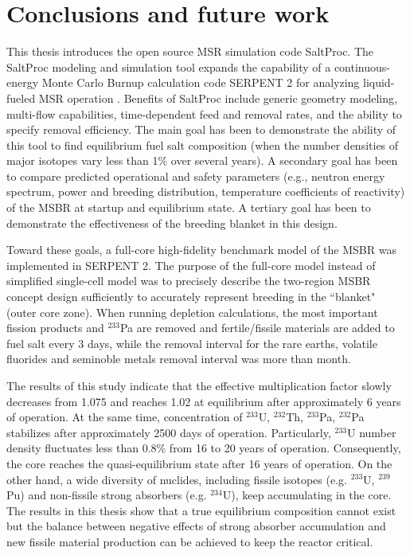 \chapter[Conclusions and future work]{Conclusions and future work}
This thesis introduces the open source \gls{MSR} simulation code SaltProc. The SaltProc modeling and simulation tool expands the capability of a continuous-energy Monte Carlo Burnup calculation code SERPENT 2 for analyzing liquid-fueled \gls{MSR} operation \cite{andrei_rykhlevskii_arfc/saltproc:_2018}. Benefits of SaltProc include generic geometry modeling, multi-flow capabilities, time-dependent feed and removal rates, and the ability to specify removal efficiency. The main goal has been to demonstrate the ability of this tool to find equilibrium fuel salt composition (when the number densities of major isotopes vary less than 1\% over several years). A secondary goal has been to compare predicted operational and safety parameters (e.g., neutron energy spectrum, power and breeding distribution, temperature coefficients of reactivity) of the \gls{MSBR} at startup and equilibrium state. A tertiary goal has been to demonstrate the effectiveness of the breeding blanket in this design.

Toward these goals, a full-core high-fidelity benchmark model of the \gls{MSBR} was implemented in SERPENT 2. The purpose of the full-core model instead of simplified single-cell model \cite{rykhlevskii_online_2017, betzler_molten_2017} was to precisely describe the two-region \gls{MSBR} concept design sufficiently to accurately represent breeding in the ``blanket" (outer core zone). When running depletion calculations, the most important fission products and $^{233}$Pa are removed and fertile/fissile materials are added to fuel salt every 3 days, while the removal interval for the rare earths, volatile fluorides and seminoble metals removal interval was more than month. 

The results of this study indicate that the effective multiplication factor slowly decreases from 1.075 and reaches 1.02 at equilibrium after approximately 6 years of operation. At the same time, concentration of $^{233}$U, $^{232}$Th, $^{233}$Pa, $^{232}$Pa stabilizes after approximately 2500 days of operation. Particularly, $^{233}$U number density fluctuates less than 0.8\% from 16 to 20 years of operation. Consequently, the core reaches the quasi-equilibrium state after 16 years of operation. On the other hand, a wide diversity of nuclides, including fissile isotopes (e.g. $^{233}$U, $^{239}$Pu) and non-fissile strong absorbers (e.g. $^{234}$U), keep accumulating in the core. The results in this thesis show that a true equilibrium composition cannot exist but the balance between negative effects of strong absorber accumulation and new fissile material production can be achieved to keep the reactor critical.

